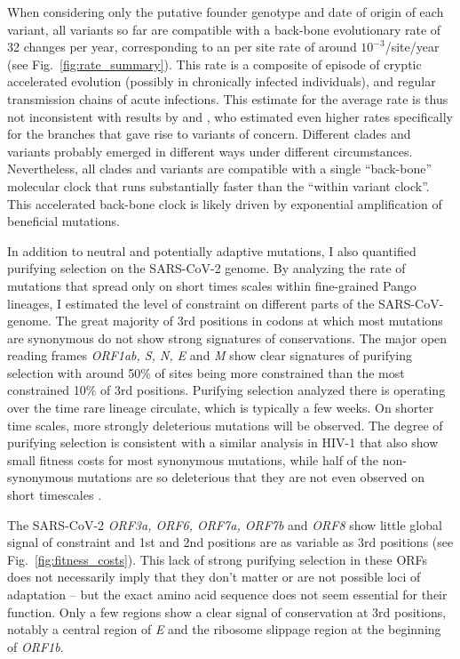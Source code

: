 \documentclass[aps,rmp, twocolumn]{revtex4}
\begin{document}
When considering only the putative founder genotype and date of origin of each variant, all variants so far are compatible with a back-bone evolutionary rate of 32 changes per year, corresponding to an per site rate of around $10^{-3}$/site/year (see Fig.~\ref{fig:rate_summary}).
This rate is a composite of episode of cryptic accelerated evolution (possibly in chronically infected individuals), and regular transmission chains of acute infections.
This estimate for the average rate is thus not inconsistent with results by \citet{hill_origins_2022} and \citet{tay_emergence_2022}, who estimated even higher rates specifically for the branches that gave rise to variants of concern.
Different clades and variants probably emerged in different ways under different circumstances.
Nevertheless, all clades and variants are compatible with a single ``back-bone'' molecular clock that runs substantially faster than the ``within variant clock''.
This accelerated back-bone clock is likely driven by exponential amplification of beneficial mutations.

In addition to neutral and potentially adaptive mutations, I also quantified purifying selection on the SARS-CoV-2 genome.
By analyzing the rate of mutations that spread only on short times scales within fine-grained Pango lineages, I estimated the level of constraint on different parts of the SARS-CoV-genome.
The great majority of 3rd positions in codons at which  most mutations are synonymous do not show strong signatures of conservations.
The major open reading frames \emph{ORF1ab, S, N, E} and \emph{M} show clear signatures of purifying selection with around 50\% of sites being more constrained than the most constrained 10\% of 3rd positions.
Purifying selection analyzed there is operating over the time rare lineage circulate, which is typically a few weeks.
On shorter time scales, more strongly deleterious mutations will be observed.
The degree of purifying selection is consistent with a similar analysis in HIV-1 that also show small fitness costs for most synonymous mutations, while half of the non-synonymous mutations are so deleterious that they are not even observed on short timescales \citep{zanini_vivo_2017}.

The SARS-CoV-2 \emph{ORF3a, ORF6, ORF7a, ORF7b} and \emph{ORF8} show little global signal of constraint and 1st and 2nd positions are as variable as 3rd positions (see Fig.~\ref{fig:fitness_costs}).
This lack of strong purifying selection in these ORFs does not necessarily imply that they don't matter or are not possible loci of adaptation -- but the exact amino acid sequence does not seem essential for their function.
Only a few regions show a clear signal of conservation at 3rd positions, notably a central region of \emph{E} and the ribosome slippage region at the beginning of \emph{ORF1b}.
\end{document}
